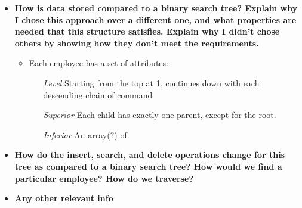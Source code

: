 \documentclass[12pt,a4paper]{article}
\begin{document}
	\begin{itemize}
		\item \textbf{How is data stored compared to a binary search tree? Explain why I chose this approach over a different one, and what properties are needed that this structure satisfies. Explain why I didn't chose others by showing how they don't meet the requirements. }
		\begin{itemize}
			\item Each employee has a set of attributes: 
			\\
			\begin{itemize}
				\item[\textit{Level}] Starting from the top at 1, continues down with each descending chain of command
				\item[\textit{Superior}] Each child has exactly one parent, except for the root. 
				\item[\textit{Inferior}] An array(?) of 
			\end{itemize}
		\end{itemize}
		
		\item \textbf{How do the insert, search, and delete operations change for this tree as compared to a binary search tree? How would we find a particular employee? How do we traverse? }
		\item \textbf{Any other relevant info}
	\end{itemize}
\end{document}
